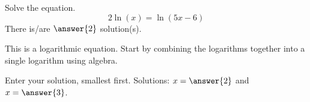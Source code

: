 \documentclass{ximera}
\author{Bobby Ramsey}
\begin{document}
\begin{exercise}
	Solve the equation.
	\[ 2\ln(x) = \ln(5x-6) \]
	There is/are $\answer{2}$ solution(s).
	\begin{hint}
		This is a logarithmic equation.  Start by combining the logarithms together into a single logarithm using algebra.
	\end{hint}
	\begin{exercise}
		Enter your solution, smallest first.
		Solutions: $x = \answer{ 2 }$ and $x = \answer{3}$.
	\end{exercise}
\end{exercise}
\end{document}
